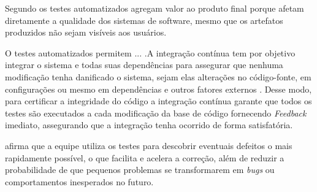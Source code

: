 Segundo  os testes automatizados agregam valor ao produto final porque afetam diretamente a qualidade dos sistemas de software, mesmo que os artefatos produzidos não sejam visíveis aos usuários.

O testes automatizados permitem ... .A integração contínua tem por objetivo integrar o sistema e todas suas dependências para assegurar que nenhuma modificação tenha danificado o sistema, sejam elas alterações no código-fonte, em configurações ou mesmo em dependências e outros fatores externos \cite{duvall2007continuous}. Desse modo, para certificar a integridade do código a integração contínua garante que todos os testes são executados a cada modificação da base de código fornecendo \textit{Feedback} imediato, assegurando que a integração tenha ocorrido de forma satisfatória.

 afirma que a equipe utiliza os testes para descobrir eventuais defeitos o mais rapidamente possível, o que facilita e acelera a correção, além de reduzir a probabilidade de que pequenos problemas se transformarem em \textit{bugs} ou comportamentos inesperados no futuro.

